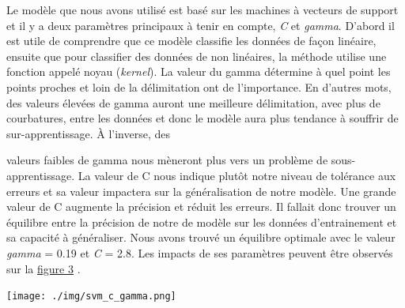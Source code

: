 \documentclass[12pt]{extarticle}
\let\cite\parencite
\begin{document}
Le modèle que nous avons utilisé est basé sur les machines à vecteurs de support et il y a deux paramètres principaux à tenir en compte, \emph{C} et \emph{gamma}. D'abord il est utile de comprendre que ce modèle classifie les données de façon linéaire, ensuite que pour classifier des données de non linéaires, la méthode utilise une fonction appelé noyau (\emph{kernel}). La valeur du gamma détermine à quel point les points proches et loin de la délimitation ont de l'importance. En d'autres mots, des valeurs élevées de gamma auront une meilleure délimitation, avec plus de courbatures, entre les données et donc le modèle aura plus tendance à souffrir de sur-apprentissage. À l'inverse, des
\begin{minipage}{.45\textwidth}
\vspace*{2.5mm}
valeurs faibles de gamma nous mèneront plus vers un problème de sous-apprentissage. La valeur de C nous indique plutôt notre niveau de tolérance aux erreurs et sa valeur impactera sur la généralisation de notre modèle. Une grande valeur de C augmente la précision et réduit les erreurs. Il fallait donc trouver un équilibre entre la précision de notre de modèle sur les données d'entrainement et sa capacité à généraliser. Nous avons trouvé un équilibre optimale avec le valeur \emph{gamma} = 0.19 et \emph{C} = 2.8. Les impacts de ses paramètres peuvent être observés sur la \hyperref[fig:svm_c_gamma]{figure 3} \cite{support_vector_machines}.
\end{minipage}
\begin{minipage}{.55\textwidth}
\vspace*{1mm}
\vspace*{-5mm}
\begin{center}
\texttt{[image: ./img/svm\_c\_gamma.png]}
\end{center}
\label{fig:svm_c_gamma}
\end{minipage}
\end{document}
